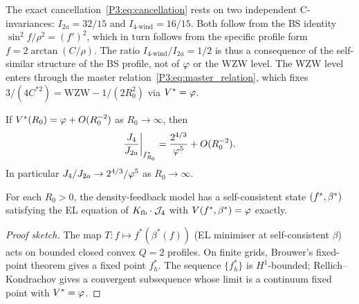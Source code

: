 \begin{remark}
\label{P3:rem:cancellation_structure}
The exact cancellation~\eqref{P3:eq:cancellation} rests on two
independent C-invariances: $I_{2a} = 32/15$ and $I_{4\text{-wind}} = 16/15$.
Both follow from the BS identity $\sin^2\!f/\rho^2 = (f')^2$,
which in turn follows from the specific profile form $f=2\arctan(C/\rho)$.
The ratio $I_{4\text{-wind}}/I_{2a}=1/2$ is thus a consequence of
the self-similar structure of the BS profile, not of $\varphi$ or the WZW level.
The WZW level enters through the master relation~\eqref{P3:eq:master_relation},
which fixes $3/(4C^{*2}) = \text{WZW} - 1/(2R_0^2)$ via $V^*=\vp$.
\end{remark}

\begin{theorem}
\label{P3:thm:lsc_2d_limit}
If $V^*(R_0) = \varphi + O(R_0^{-2})$ as $R_0\to\infty$, then
\begin{equation}
  \frac{J_4}{J_{2a}}\bigg|_{f^*_{R_0}} = \frac{2^{4/3}}{\varphi^5} + O(R_0^{-2}).
  \label{P3:eq:lsc_limit}
\end{equation}
In particular $J_4/J_{2a} \to 2^{4/3}/\varphi^5$ as $R_0\to\infty$.
\end{theorem}

\begin{theorem}[Exact $V^*=\vp$ for all finite $R_0$]
\label{P3:thm:V_exact_all_R0}
For each $R_0>0$, the density-feedback model has a self-consistent state
$(f^*,\beta^{*})$ satisfying the EL equation of $K_{\mathrm{fb}}\cdot\mathcal{J}_4$ with
$V(f^*,\beta^{*}) = \varphi$ exactly.
\end{theorem}
\begin{proof}[Proof sketch]
The map $T: f\mapsto f^*(\beta^*(f))$ (EL minimiser at self-consistent $\beta$)
acts on bounded closed convex $Q=2$ profiles.
On finite grids, Brouwer's fixed-point theorem gives a fixed point $f^*_h$.
The sequence $\{f^*_h\}$ is $H^1$-bounded; Rellich--Kondrachov gives a
convergent subsequence whose limit is a continuum fixed point with $V^*=\vp$.
\end{proof}

